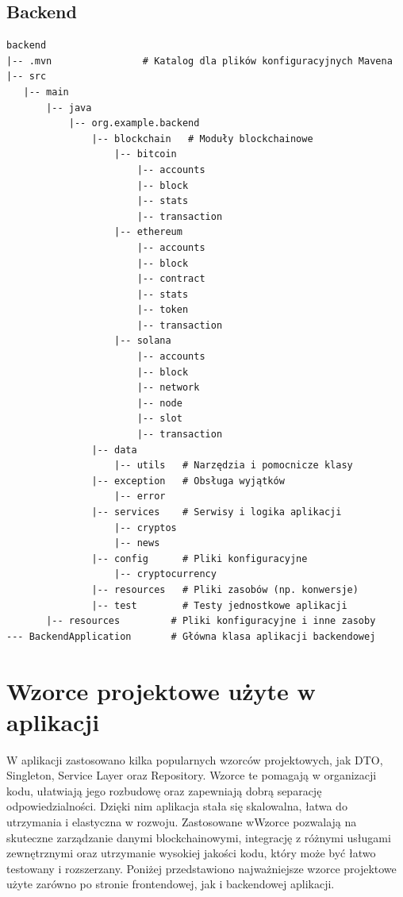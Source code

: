 \subsection{Backend}
{\footnotesize
\begin{verbatim}
backend
|-- .mvn                # Katalog dla plików konfiguracyjnych Mavena
|-- src
   |-- main
       |-- java
           |-- org.example.backend
               |-- blockchain   # Moduły blockchainowe
                   |-- bitcoin
                       |-- accounts
                       |-- block
                       |-- stats
                       |-- transaction
                   |-- ethereum
                       |-- accounts
                       |-- block
                       |-- contract
                       |-- stats
                       |-- token
                       |-- transaction
                   |-- solana
                       |-- accounts
                       |-- block
                       |-- network
                       |-- node
                       |-- slot
                       |-- transaction
               |-- data
                   |-- utils   # Narzędzia i pomocnicze klasy
               |-- exception   # Obsługa wyjątków
                   |-- error
               |-- services    # Serwisy i logika aplikacji
                   |-- cryptos
                   |-- news
               |-- config      # Pliki konfiguracyjne
                   |-- cryptocurrency
               |-- resources   # Pliki zasobów (np. konwersje)
               |-- test        # Testy jednostkowe aplikacji
       |-- resources         # Pliki konfiguracyjne i inne zasoby
--- BackendApplication       # Główna klasa aplikacji backendowej
\end{verbatim}
}

\section{Wzorce projektowe użyte w aplikacji}

W aplikacji zastosowano kilka popularnych wzorców projektowych, jak DTO, Singleton, Service Layer oraz Repository. Wzorce te pomagają w organizacji kodu, ułatwiają jego rozbudowę oraz zapewniają dobrą separację odpowiedzialności. Dzięki nim aplikacja stała się skalowalna, łatwa do utrzymania i elastyczna w rozwoju. Zastosowane wWzorce pozwalają na skuteczne zarządzanie danymi blockchainowymi, integrację z różnymi usługami zewnętrznymi oraz utrzymanie wysokiej jakości kodu, który może być łatwo testowany i rozszerzany. Poniżej przedstawiono najważniejsze wzorce projektowe użyte zarówno po stronie frontendowej, jak i backendowej aplikacji.

